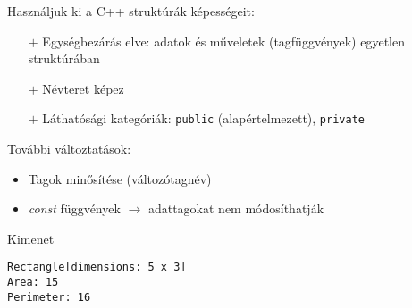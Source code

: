 \documentclass[usenames,dvipsnames,aspectratio=169]{beamer}
\begin{document}
\begin{frame}
    Használjuk ki a C++ struktúrák képességeit:
    \begin{itemize}
        \item[$+$] Egységbezárás elve: adatok és műveletek (tagfüggvények) egyetlen struktúrában
        \item[$+$] Névteret képez 
        \item[$+$] Láthatósági kategóriák: \texttt{public} (alapértelmezett), \texttt{private} 
    \end{itemize}
    \vfill
    További változtatások:
    \begin{itemize}
        \item Tagok minősítése (változótagnév)
        \item \emph{const} függvények $\to$ adattagokat nem módosíthatják
    \end{itemize}
\end{frame}

\begin{frame}
    \begin{exampleblock}{}
        \small
        
    \end{exampleblock}
\end{frame}

\begin{frame}
    \begin{exampleblock}{}
        \small
        
    \end{exampleblock}
\end{frame}

\begin{frame}[fragile]
    \begin{exampleblock}{}
        \scriptsize
        
    \end{exampleblock}
    \begin{block}{Kimenet}
        \vspace{-.3cm}
        \tiny
        \begin{verbatim}
Rectangle[dimensions: 5 x 3]
Area: 15
Perimeter: 16
\end{verbatim}
    \vspace{-.3cm}
    \end{block}
\end{frame}
\end{document}
